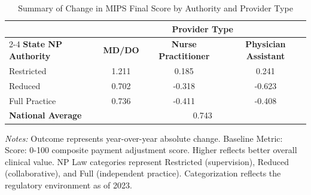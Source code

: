 \begin{table}[htbp]
    \centering
    \caption{Summary of Change in MIPS Final Score by Authority and Provider Type}
    \label{tab:d_mips_final_score_provtype}
    \vspace{0.2cm}
    \begin{tabular}{lccc}
        \toprule
        & \multicolumn{3}{c}{\textbf{Provider Type}} \\
        \cmidrule(lr){2-4}
        \textbf{State NP Authority} & \textbf{MD/DO} & \textbf{Nurse Practitioner} & \textbf{Physician Assistant} \\
        \midrule
        Restricted & 1.211 & 0.185 & 0.241 \\
        Reduced & 0.702 & -0.318 & -0.623 \\
        Full Practice & 0.736 & -0.411 & -0.408 \\
        \midrule
        \textbf{National Average} & \multicolumn{3}{c}{0.743} \\
        \bottomrule
    \end{tabular}
    \vspace{0.1cm}
    \begin{minipage}{0.85\textwidth}
        \footnotesize \textit{Notes:} Outcome represents year-over-year absolute change. Baseline Metric: Score: 0-100 composite payment adjustment score. Higher reflects better overall clinical value. NP Law categories represent Restricted (supervision), Reduced (collaborative), and Full (independent practice). Categorization reflects the regulatory environment as of 2023.
    \end{minipage}
\end{table}
